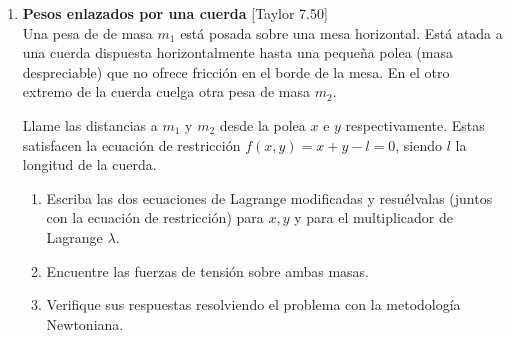 \documentclass[11pt,spanish,a4paper]{article}
\begin{document}
\begin{enumerate}
\item 
\textbf{Pesos enlazados por una cuerda} [Taylor 7.50]\\
Una pesa de de masa \(m_1\) está posada sobre una mesa horizontal.
Está atada a una cuerda dispuesta horizontalmente hasta una pequeña polea (masa despreciable) que no ofrece fricción en el borde de la mesa.
En el otro extremo de la cuerda cuelga otra pesa de masa \(m_2\).

Llame las distancias a \(m_1\) y \(m_2\) desde la polea \(x\) e \(y\) respectivamente.
Estas satisfacen la ecuación de restricción \(f (x, y) = x + y -l = 0\), siendo \(l\) la longitud de la cuerda.
\begin{enumerate}
\item Escriba las dos ecuaciones de Lagrange modificadas y resuélvalas (juntos con la ecuación de restricción) para \(x, y\) y para el multiplicador de Lagrange \(\lambda\).
\item Encuentre las fuerzas de tensión sobre ambas masas.
\item Verifique sus respuestas resolviendo el problema con la metodología Newtoniana.
\end{enumerate}





\end{enumerate}
\end{document}
